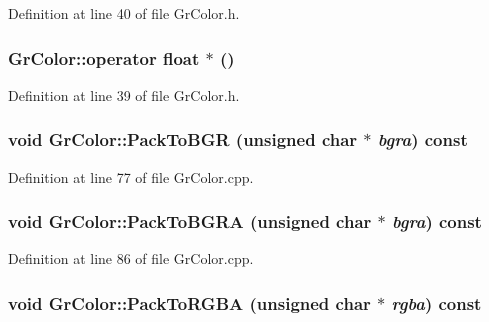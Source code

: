 Definition at line 40 of file GrColor.h.\hypertarget{class_gr_color_01b3d412305d1df103e394ce70f91163}{
\subsubsection[{operator float $\ast$}]{\setlength{\rightskip}{0pt plus 5cm}GrColor::operator float $\ast$ ()}}
\label{class_gr_color_01b3d412305d1df103e394ce70f91163}




Definition at line 39 of file GrColor.h.\hypertarget{class_gr_color_838f112474fc99372ee1aac864b8ec66}{
\subsubsection[{PackToBGR}]{\setlength{\rightskip}{0pt plus 5cm}void GrColor::PackToBGR (unsigned char $\ast$ {\em bgra}) const}}
\label{class_gr_color_838f112474fc99372ee1aac864b8ec66}




Definition at line 77 of file GrColor.cpp.\hypertarget{class_gr_color_6ed58d5f43c9ad35717e84578bd8f51a}{
\subsubsection[{PackToBGRA}]{\setlength{\rightskip}{0pt plus 5cm}void GrColor::PackToBGRA (unsigned char $\ast$ {\em bgra}) const}}
\label{class_gr_color_6ed58d5f43c9ad35717e84578bd8f51a}




Definition at line 86 of file GrColor.cpp.\hypertarget{class_gr_color_2ecf5448eba8df51f4138d693b88af82}{
\subsubsection[{PackToRGBA}]{\setlength{\rightskip}{0pt plus 5cm}void GrColor::PackToRGBA (unsigned char $\ast$ {\em rgba}) const}}
\label{class_gr_color_2ecf5448eba8df51f4138d693b88af82}




